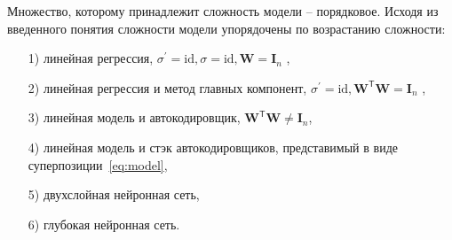 \documentclass[12pt, twoside]{article}
\newcommand{\w}{{\mathbf{W}}}
\begin{document}
Множество, которому принадлежит сложность модели – порядковое. Исходя из введенного понятия сложности модели упорядочены 
по возрастанию сложности:
\begin{enumerate}
\item[1)] линейная регрессия,  $\sigma^{'} = \text{id}, \sigma = \text{id}, \w = \mathbf{I}_n $ ,
\item[2)] линейная регрессия и метод главных компонент, $\sigma^{'} = \text{id}, \w^\mathsf{T}\w = \mathbf{I}_n $ ,
\item[3)] линейная модель и автокодировщик, $\w^\mathsf{T}\w \neq \textbf{I}_n$,
\item[4)] линейная модель и стэк автокодировщиков, представимый в виде суперпозиции~\eqref{eq:model},
\item[5)] двухслойная нейронная сеть,
\item[6)] глубокая нейронная сеть.
\end{enumerate}
\end{document}
